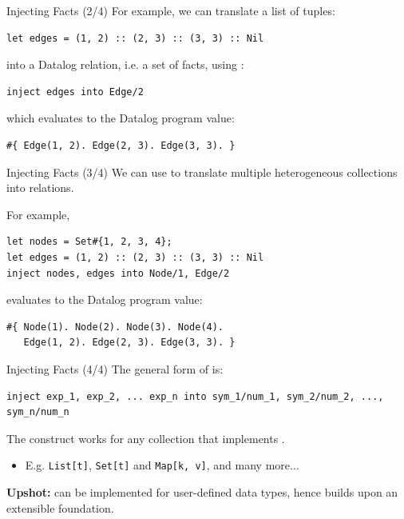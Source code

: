 \begin{frame}[fragile]{Injecting Facts (2/4)}
For example, we can translate a list of tuples:

\begin{lstlisting}[language=flix, xleftmargin=0.8cm]
let edges = (1, 2) :: (2, 3) :: (3, 3) :: Nil
\end{lstlisting}

into a Datalog relation, i.e. a set of facts, using :

\begin{lstlisting}[language=flix, xleftmargin=0.8cm]
inject edges into Edge/2
\end{lstlisting}

which evaluates to the Datalog program value:

\begin{lstlisting}[language=flix, xleftmargin=0.8cm]
#{ Edge(1, 2). Edge(2, 3). Edge(3, 3). }
\end{lstlisting}
\end{frame}

\begin{frame}[fragile]{Injecting Facts (3/4)}
We can use  to translate multiple heterogeneous collections into
relations.

For example, 

\begin{lstlisting}[language=flix, xleftmargin=0.8cm]
let nodes = Set#{1, 2, 3, 4};
let edges = (1, 2) :: (2, 3) :: (3, 3) :: Nil
inject nodes, edges into Node/1, Edge/2
\end{lstlisting}

evaluates to the Datalog program value:

\begin{lstlisting}[language=flix, xleftmargin=0.8cm]
#{ Node(1). Node(2). Node(3). Node(4). 
   Edge(1, 2). Edge(2, 3). Edge(3, 3). }
\end{lstlisting}
\end{frame}

\begin{frame}[fragile]{Injecting Facts (4/4)}
The general form of  is:

\begin{lstlisting}[language=flix, xleftmargin=0.8cm]
inject exp_1, exp_2, ... exp_n into sym_1/num_1, sym_2/num_2, ..., sym_n/num_n
\end{lstlisting}

The  construct works for any collection that implements
. 

\begin{itemize}
    \item E.g. \texttt{List[t]}, \texttt{Set[t]} and \texttt{Map[k, v]}, and many more...
\end{itemize}

\pause

\textbf{Upshot:}  can be implemented for user-defined data
types, hence  builds upon an extensible foundation.
\end{frame}


